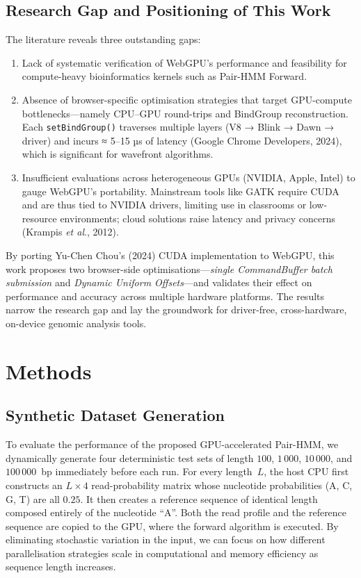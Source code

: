 \documentclass[PhD]{PHlab-thesis}
\begin{document}
\section{Research Gap and Positioning of This Work}
The literature reveals three outstanding gaps:

\begin{enumerate}
  \item Lack of systematic verification of WebGPU's performance and feasibility for compute-heavy bioinformatics kernels such as Pair-HMM Forward.
  \item Absence of browser-specific optimisation strategies that target GPU-compute bottlenecks—namely CPU–GPU round-trips and BindGroup reconstruction. Each \verb|setBindGroup()| traverses multiple layers (V8 → Blink → Dawn → driver) and incurs ≈ 5–15 µs of latency (Google Chrome Developers, 2024), which is significant for wavefront algorithms.
  \item Insufficient evaluations across heterogeneous GPUs (NVIDIA, Apple, Intel) to gauge WebGPU's portability. Mainstream tools like GATK require CUDA and are thus tied to NVIDIA drivers, limiting use in classrooms or low-resource environments; cloud solutions raise latency and privacy concerns (Krampis \emph{et al}., 2012).
\end{enumerate}

By porting Yu-Chen Chou's (2024) CUDA implementation to WebGPU, this work proposes two browser-side optimisations—\emph{single CommandBuffer batch submission} and \emph{Dynamic Uniform Offsets}—and validates their effect on performance and accuracy across multiple hardware platforms. The results narrow the research gap and lay the groundwork for driver-free, cross-hardware, on-device genomic analysis tools.





\chapter{Methods}

\section{Synthetic Dataset Generation}\label{sec:dataset}
To evaluate the performance of the proposed GPU-accelerated Pair-HMM, we
dynamically generate four deterministic test sets of length
$100$, $1\,000$, $10\,000$, and $100\,000$~bp immediately before each run.
For every length~$L$, the host CPU first constructs an
$L\times4$ read-probability matrix whose nucleotide probabilities
(A, C, G, T) are all $0.25$.
It then creates a reference sequence of identical length composed entirely
of the nucleotide “A”.
Both the read profile and the reference sequence are copied to the GPU,
where the forward algorithm is executed.
By eliminating stochastic variation in the input, we can focus on how
different parallelisation strategies scale in computational and memory
efficiency as sequence length increases.
\end{document}
